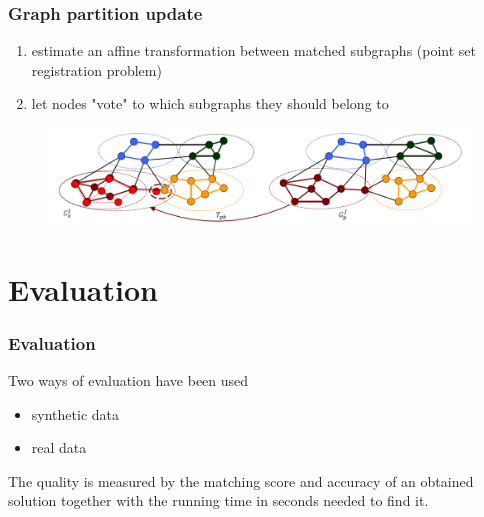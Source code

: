 \documentclass[hyperref={pdfpagelabels=false}]{beamer}
\begin{document}
\begin{frame}
\frametitle{Graph partition update}
\begin{enumerate}
\item estimate an affine transformation between matched subgraphs (point set registration problem)
\item let nodes "vote" to which subgraphs they should belong to
\end{enumerate}
\begin{figure} [h]
	\centering
	\includegraphics[scale=0.35]{fig/2levelGM/update.png}
\end{figure}
\end{frame}
\section{Evaluation} 
\begin{frame}
\frametitle{Evaluation}
Two ways of evaluation have been used
\begin{itemize}
\item synthetic data
\item real data
\end{itemize}

The quality is measured by the matching score and accuracy of an obtained solution together with the running time in seconds needed to find it.

\end{frame}
\end{document}
